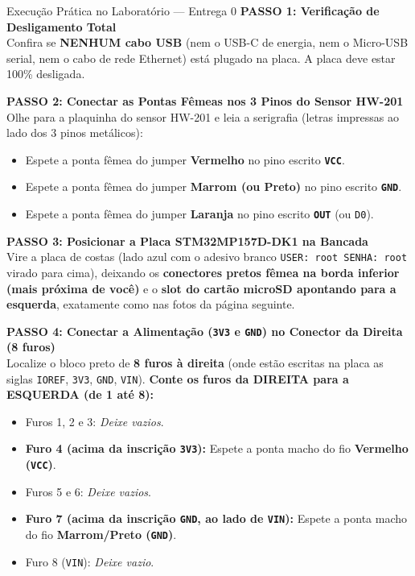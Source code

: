\documentclass[11pt,a4paper]{article}
\begin{document}
\begin{labbox}{Execução Prática no Laboratório --- Entrega 0}
\textbf{PASSO 1: Verificação de Desligamento Total} \\
Confira se \textbf{NENHUM cabo USB} (nem o USB-C de energia, nem o Micro-USB serial, nem o cabo de rede Ethernet) está plugado na placa. A placa deve estar 100\% desligada.

\vspace{0.2cm}
\textbf{PASSO 2: Conectar as Pontas Fêmeas nos 3 Pinos do Sensor HW-201} \\
Olhe para a plaquinha do sensor HW-201 e leia a serigrafia (letras impressas ao lado dos 3 pinos metálicos):
\begin{itemize}[leftmargin=*]
    \item Espete a ponta fêmea do jumper \textbf{Vermelho} no pino escrito \textbf{\texttt{VCC}}.
    \item Espete a ponta fêmea do jumper \textbf{Marrom (ou Preto)} no pino escrito \textbf{\texttt{GND}}.
    \item Espete a ponta fêmea do jumper \textbf{Laranja} no pino escrito \textbf{\texttt{OUT}} (ou \texttt{D0}).
\end{itemize}

\vspace{0.2cm}
\textbf{PASSO 3: Posicionar a Placa STM32MP157D-DK1 na Bancada} \\
Vire a placa de costas (lado azul com o adesivo branco \texttt{USER: root SENHA: root} virado para cima), deixando os \textbf{conectores pretos fêmea na borda inferior (mais próxima de você)} e o \textbf{slot do cartão microSD apontando para a esquerda}, exatamente como nas fotos da página seguinte.

\vspace{0.2cm}
\textbf{PASSO 4: Conectar a Alimentação (\texttt{3V3} e \texttt{GND}) no Conector da Direita (8 furos)} \\
Localize o bloco preto de \textbf{8 furos à direita} (onde estão escritas na placa as siglas \texttt{IOREF}, \texttt{3V3}, \texttt{GND}, \texttt{VIN}). \textbf{Conte os furos da DIREITA para a ESQUERDA (de 1 até 8):}
\begin{itemize}[leftmargin=*]
    \item Furos 1, 2 e 3: \textit{Deixe vazios}.
    \item \textbf{Furo 4 (acima da inscrição \texttt{3V3}):} Espete a ponta macho do fio \textbf{Vermelho (\texttt{VCC})}.
    \item Furos 5 e 6: \textit{Deixe vazios}.
    \item \textbf{Furo 7 (acima da inscrição \texttt{GND}, ao lado de \texttt{VIN}):} Espete a ponta macho do fio \textbf{Marrom/Preto (\texttt{GND})}.
    \item Furo 8 (\texttt{VIN}): \textit{Deixe vazio}.
\end{itemize}


\end{labbox}
\end{document}
